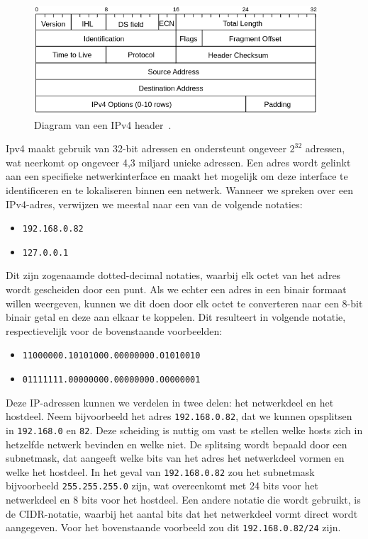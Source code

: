 \begin{figure}[h!]
    \begin{center}
        \includegraphics[width=300pt]
        {./graphics/network/ipv4-header.png}
        \caption[IPv4 header diagram.]{\label{fig:network-ipv4-header}Diagram van een IPv4 header~\autocite{dordal2020}.}
    \end{center}
\end{figure}

Ipv4 maakt gebruik van 32-bit adressen en ondersteunt ongeveer \(2^{32}\) adressen, wat neerkomt op ongeveer 4,3 miljard unieke adressen.
Een adres wordt gelinkt aan een specifieke netwerkinterface en maakt het mogelijk om deze interface te identificeren en te lokaliseren binnen een netwerk.
Wanneer we spreken over een IPv4-adres, verwijzen we meestal naar een van de volgende notaties:

\begin{itemize}
    \item \texttt{192.168.0.82}
    \item \texttt{127.0.0.1}
\end{itemize}

Dit zijn zogenaamde dotted-decimal notaties, waarbij elk octet van het adres wordt gescheiden door een punt.
Als we echter een adres in een binair formaat willen weergeven, kunnen we dit doen door elk octet te converteren naar een 8-bit binair getal en deze aan elkaar te koppelen.
Dit resulteert in volgende notatie, respectievelijk voor de bovenstaande voorbeelden:

\begin{itemize}
    \item \texttt{11000000.10101000.00000000.01010010}
    \item \texttt{01111111.00000000.00000000.00000001}
\end{itemize}

Deze IP-adressen kunnen we verdelen in twee delen: het netwerkdeel en het hostdeel.
Neem bijvoorbeeld het adres \texttt{192.168.0.82}, dat we kunnen opsplitsen in \texttt{192.168.0} en \texttt{82}.
Deze scheiding is nuttig om vast te stellen welke hosts zich in hetzelfde netwerk bevinden en welke niet.
De splitsing wordt bepaald door een subnetmask, dat aangeeft welke bits van het adres het netwerkdeel vormen en welke het hostdeel.
In het geval van \texttt{192.168.0.82} zou het subnetmask bijvoorbeeld \texttt{255.255.255.0} zijn, wat overeenkomt met 24 bits voor het netwerkdeel en 8 bits voor het hostdeel.
Een andere notatie die wordt gebruikt, is de CIDR-notatie, waarbij het aantal bits dat het netwerkdeel vormt direct wordt aangegeven.
Voor het bovenstaande voorbeeld zou dit \texttt{192.168.0.82/24} zijn.

